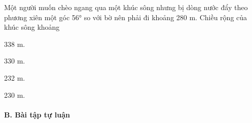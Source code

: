 \documentclass[%
    fontsize=12pt,%
    chapterprefix=false,%
    open=right,%
    twoside=false,%
    numbers=noenddot,%
    headings=optiontohead,%
    final,%
    DIV=15,%
    parskip=half %
]{scrbook}
\begin{document}
\begin{tracnghiem}
\item Một người muốn chèo ngang qua một khúc sông nhưng bị dòng nước đẩy theo phương xiên một góc 56° so với bờ nên phải đi khoảng 280 m. Chiều rộng của khúc sông khoảng
\begin{options}
  \item 338 m.
  \item 330 m.
  \item 232 m.
  \item 230 m.
\end{options}

\end{tracnghiem}

\paragraph{B. Bài tập tự luận}
\end{document}
